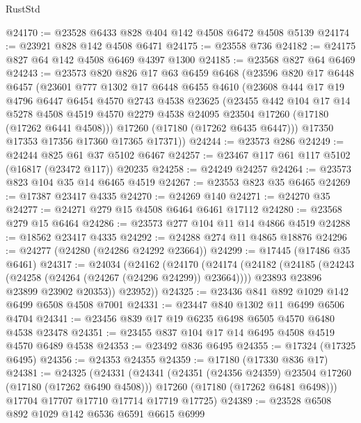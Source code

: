 \begin{lexlean}{RustStd}
\begin{coremodule}
@24170 := @23528 @6433 @828 @404 @142 @4508 @6472 @4508 @5139
@24174 := @23921 @828 @142 @4508 @6471
@24175 := @23558 @736
@24182 := @24175 @827 @64 @142 @4508 @6469 @4397 @1300
@24185 := @23568 @827 @64 @6469
@24243 := @23573
    @820
    @826
    @17
    @63
    @6459
    @6468
    (@23596
      @820
      @17
      @6448
      @6457
      (@23601
        @777
        @1302
        @17
        @6448
        @6455
        @4610
        (@23608
          @444
          @17
          @19
          @4796
          @6447
          @6454
          @4570
          @2743
          @4538
          @23625
          (@23455
            @442
            @104
            @17
            @14
            @5278
            @4508
            @4519
            @4570
            @2279
            @4538
            @24095
            @23504
            @17260
            (@17180 (@17262 @6441 @4508)))
          @17260
          (@17180 (@17262 @6435 @6447)))
        @17350
        @17353
        @17356
        @17360
        @17365
        @17371))
@24244 := @23573 @286
@24249 := @24244 @825 @61 @37 @5102 @6467
@24257 := @23467 @117 @61 @117 @5102 (@16817 (@23472 @117)) @20235
@24258 := @24249 @24257
@24264 := @23573 @823 @104 @35 @14 @6465 @4519
@24267 := @23553 @823 @35 @6465
@24269 := @17387 @23417 @4335
@24270 := @24269 @140
@24271 := @24270 @35
@24277 := @24271 @279 @15 @4508 @6464 @6461 @17112
@24280 := @23568 @279 @15 @6464
@24286 := @23573 @277 @104 @11 @14 @4866 @4519
@24288 := @18562 @23417 @4335
@24292 := @24288 @274 @11 @4865 @18876
@24296 := @24277 (@24280 (@24286 @24292 @23664))
@24299 := @17445 (@17486 @35 @6461)
@24317 := @24034
    (@24162
      (@24170
        (@24174
          (@24182
            (@24185 (@24243 (@24258 (@24264 (@24267 (@24296 @24299)) @23664))))
            @23893
            @23896
            @23899
            @23902
            @20353))
        @23952))
@24325 := @23436 @841 @892 @1029 @142 @6499 @6508 @4508 @7001
@24331 := @23447 @840 @1302 @11 @6499 @6506 @4704
@24341 := @23456 @839 @17 @19 @6235 @6498 @6505 @4570 @6480 @4538 @23478
@24351 := @23455 @837 @104 @17 @14 @6495 @4508 @4519 @4570 @6489 @4538
@24353 := @23492 @836 @6495
@24355 := @17324 (@17325 @6495)
@24356 := @24353 @24355
@24359 := @17180 (@17330 @836 @17)
@24381 := @24325
    (@24331
      (@24341
        (@24351 (@24356 @24359) @23504 @17260 (@17180 (@17262 @6490 @4508)))
        @17260
        (@17180 (@17262 @6481 @6498)))
      @17704
      @17707
      @17710
      @17714
      @17719
      @17725)
@24389 := @23528 @6508 @892 @1029 @142 @6536 @6591 @6615 @6999

\end{coremodule}
\end{lexlean}

